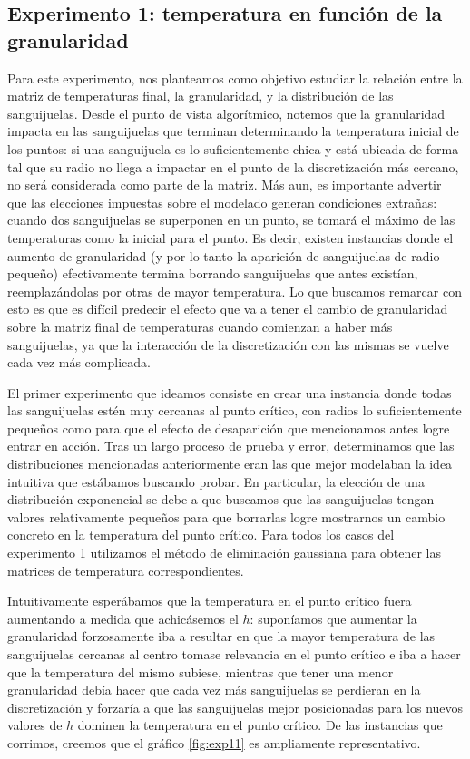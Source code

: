 \subsection{Experimento 1: temperatura en función de la granularidad}

Para este experimento, nos planteamos como objetivo estudiar la relación entre la matriz de temperaturas final, la granularidad, y la distribución de las sanguijuelas. Desde el punto de vista algorítmico, notemos que la granularidad impacta en las sanguijuelas que terminan determinando la temperatura inicial de los puntos: si una sanguijuela es lo suficientemente chica y está ubicada de forma tal que su radio no llega a impactar en el punto de la discretización más cercano, no será considerada como parte de la matriz. Más aun, es importante advertir que las elecciones impuestas sobre el modelado generan condiciones extrañas: cuando dos sanguijuelas se superponen en un punto, se tomará el máximo de las temperaturas como la inicial para el punto. Es decir, existen instancias donde el aumento de granularidad (y por lo tanto la aparición de sanguijuelas de radio pequeño) efectivamente termina borrando sanguijuelas que antes existían, reemplazándolas por otras de mayor temperatura. Lo que buscamos remarcar con esto es que es difícil predecir el efecto que va a tener el cambio de granularidad sobre la matriz final de temperaturas cuando comienzan a haber más sanguijuelas, ya que la interacción de la discretización con las mismas se vuelve cada vez más complicada.

El primer experimento que ideamos consiste en crear una instancia donde todas las sanguijuelas estén muy cercanas al punto crítico, con radios lo suficientemente pequeños como para que el efecto de desaparición que mencionamos antes logre entrar en acción. Tras un largo proceso de prueba y error, determinamos que las distribuciones mencionadas anteriormente eran las que mejor modelaban la idea intuitiva que estábamos buscando probar. En particular, la elección de una distribución exponencial se debe a que buscamos que las sanguijuelas tengan valores relativamente pequeños para que borrarlas logre mostrarnos un cambio concreto en la temperatura del punto crítico. Para todos los casos del experimento 1 utilizamos el método de eliminación gaussiana para obtener las matrices de temperatura correspondientes.

Intuitivamente esperábamos que la temperatura en el punto crítico fuera aumentando a medida que achicásemos el $h$: suponíamos que aumentar la granularidad forzosamente iba a resultar en que la mayor temperatura de las sanguijuelas cercanas al centro tomase relevancia en el punto crítico e iba a hacer que la temperatura del mismo subiese, mientras que tener una menor granularidad debía hacer que cada vez más sanguijuelas se perdieran en la discretización y forzaría a que las sanguijuelas mejor posicionadas para los nuevos valores de $h$ dominen la temperatura en el punto crítico. De las instancias que corrimos, creemos que el gráfico \ref{fig:exp11} es ampliamente representativo.

